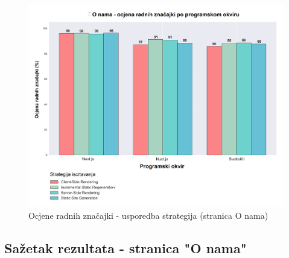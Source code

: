 \begin{figure}[H]
    \centering
    \includegraphics[width=\textwidth]{slike/rezultati/about/about_strategy_comparison.png}
    \caption{Ocjene radnih značajki - usporedba strategija (stranica O nama)}
    \label{fig:testiranje-o-nama-usporedba-strategija}
\end{figure}

\newpage

\subsection{Sažetak rezultata - stranica "O nama"}

